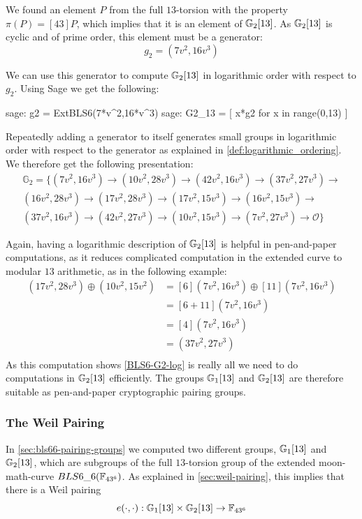 We found an element $P$ from the full $13$-torsion with the property $\pi(P) = [43]P$, which implies that it is an element of $\mathbb{G}_2[13]$. As $\mathbb{G}_2[13]$ is cyclic and of prime order, this element must be a generator:
\begin{equation}
g_{2} = (7v^2, 16v^3)
\end{equation}

We can use this generator to compute $\mathbb{G}_2[13]$ in logarithmic order with respect to $g_{2}$. Using Sage we get the following:
\begin{sagecommandline}
sage: g2 = ExtBLS6(7*v^2,16*v^3)
sage: G2_13 = [ x*g2 for x in range(0,13) ]
\end{sagecommandline}
Repeatedly adding a generator to itself generates small groups in logarithmic order with respect to the generator as explained in \ref{def:logarithmic_ordering}. We therefore get the following presentation:
\begin{multline}
\label{BLS6-G2-log}
\mathbb{G}_2=\{
(7v^2, 16v^3) \to
(10v^2, 28v^3)\to
(42v^2, 16v^3)\to
(37v^2, 27v^3)\to\\
(16v^2, 28v^3)\to
(17v^2, 28v^3)\to
(17v^2, 15v^3)\to
(16v^2, 15v^3)\to\\
(37v^2, 16v^3)\to
(42v^2, 27v^3)\to
(10v^2, 15v^3)\to
(7v^2, 27v^3)\to
\mathcal{O}\}
\end{multline}

Again, having a logarithmic description of $\mathbb{G}_2[13]$ is helpful in pen-and-paper computations, as it reduces complicated computation in the extended curve to modular $13$ arithmetic, as in the following example:
\begin{align*}
(17v^2,28v^3)\oplus (10v^2,15v^2)  & = [6](7v^2,16v^3)\oplus [11](7v^2,16v^3)\\
                      & = [6+11](7v^2,16v^3)\\
                      & = [4](7v^2,16v^3)\\
                      & = (37v^2,27v^3)\\
\end{align*}
As this computation shows \ref{BLS6-G2-log} is really all we need to do computations in $\mathbb{G}_2[13]$ efficiently. The groups $\mathbb{G}_1[13]$ and $\mathbb{G}_2[13]$ are therefore suitable as pen-and-paper cryptographic pairing groups. 

\subsubsection{The Weil Pairing}
In \ref{sec:bls66-pairing-groups} we computed two different groups, $\mathbb{G}_1[13]$ and $\mathbb{G}_2[13]$, which are subgroups of the full $13$-torsion group of the extended moon-math-curve $BLS6\_6(\mathbb{F}_{43^6})$. As explained in \ref{sec:weil-pairing}, this implies that there is a Weil pairing 
\begin{equation}
\label{BLS6-weil-pairing}
e(\cdot,\cdot): \mathbb{G}_1[13]\times\mathbb{G}_2[13] \to \mathbb{F}_{43^6}
\end{equation}

